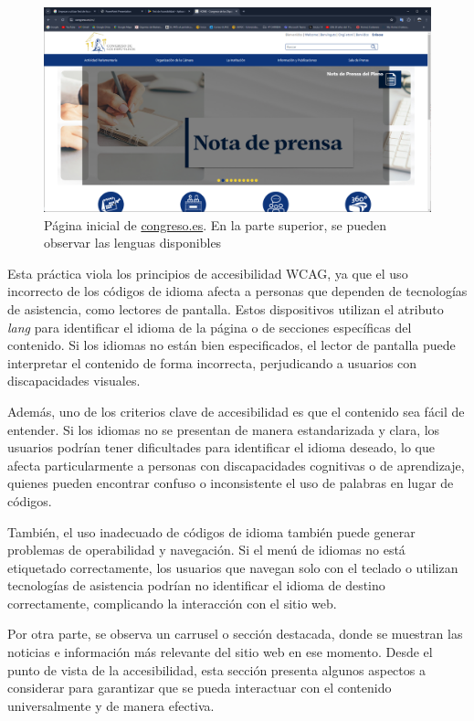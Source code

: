 \documentclass[]{article}
\begin{document}
\begin{figure}[h]
	\centering
	\includegraphics[width=\textwidth]{Capturas/6.png}
	\caption{Página inicial de \href{https://www.congreso.es/es/home}{congreso.es}. En la parte superior, se pueden observar las lenguas disponibles}
	\label{fig:etiqueta}
\end{figure}

Esta práctica viola los principios de accesibilidad WCAG, ya que el uso incorrecto de los códigos de idioma afecta a personas que dependen de tecnologías de asistencia, como lectores de pantalla. Estos dispositivos utilizan el atributo \textit{lang} para identificar el idioma de la página o de secciones específicas del contenido. Si los idiomas no están bien especificados, el lector de pantalla puede interpretar el contenido de forma incorrecta, perjudicando a usuarios con discapacidades visuales.

Además, uno de los criterios clave de accesibilidad es que el contenido sea fácil de entender. Si los idiomas no se presentan de manera estandarizada y clara, los usuarios podrían tener dificultades para identificar el idioma deseado, lo que afecta particularmente a personas con discapacidades cognitivas o de aprendizaje, quienes pueden encontrar confuso o inconsistente el uso de palabras en lugar de códigos.

También, el uso inadecuado de códigos de idioma también puede generar problemas de operabilidad y navegación. Si el menú de idiomas no está etiquetado correctamente, los usuarios que navegan solo con el teclado o utilizan tecnologías de asistencia podrían no identificar el idioma de destino correctamente, complicando la interacción con el sitio web.

Por otra parte, se observa un carrusel o sección destacada, donde se muestran las noticias e información más relevante del sitio web en ese momento. Desde el punto de vista de la accesibilidad, esta sección presenta algunos aspectos a considerar para garantizar que se pueda interactuar con el contenido universalmente y de manera efectiva.
\end{document}

